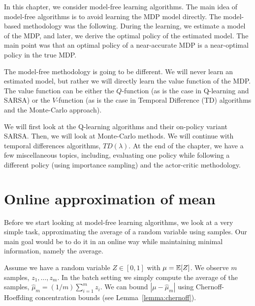 In this chapter, we consider model-free learning algorithms. The main
idea of model-free algorithms is to avoid learning the MDP model
directly. The model-based methodology was the following. During the
learning, we estimate a model of the MDP, and later,  we derive the
optimal policy of the estimated model. The main point was that an
optimal policy of a near-accurate MDP is a near-optimal policy in
the true MDP.

The model-free methodology is going to be different. We will never
learn an estimated model, but rather we will directly learn the
value function of the MDP. The value function can be either the
$Q$-function (as is the case in Q-learning and SARSA) or the
$V$-function (as is the case in Temporal Difference (TD) algorithms
and the Monte-Carlo approach).

We will first look at the Q-learning algorithms and their on-policy
variant SARSA. Then, we will look at Monte-Carlo methods. We will
continue with temporal differences algorithms, $TD(\lambda)$. At the
end of the chapter, we have a few miscellaneous topics, including,
evaluating one policy while following a different policy (using
importance sampling) and the actor-critic methodology.



\section{Online approximation of mean}

Before we start looking at model-free learning algorithms, we look
at a very simple task, approximating the average of a random
variable using samples. Our main goal would be to do it in an online
way while maintaining minimal information, namely the average.

Assume we have a random variable $Z\in [0,1]$ with $\mu=\mathbb{E}[Z]$. We
observe $m$ samples, $z_1, \ldots , z_m$. In the batch setting we
simply compute the average of the samples,
$\widehat{\mu}_m=(1/m)\sum_{i=1}^m z_i$. We can bound
$|\mu-\widehat{\mu}_m|$ using Chernoff-Hoeffding concentration
bounds (see Lemma~\ref{lemma:chernoff}).

